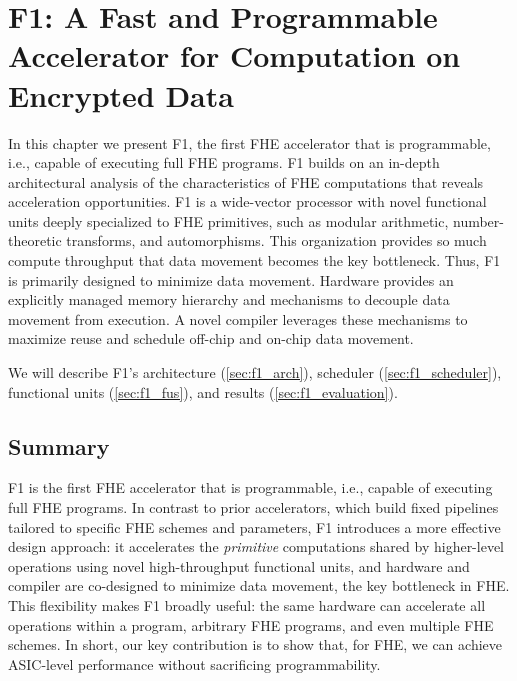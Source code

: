 \documentclass[12pt,twoside]{mitthesis}
\begin{document}


\pagestyle{plain}





\chapter{F1: A Fast and Programmable Accelerator for Computation on Encrypted Data}

In this chapter we present F1, the first FHE accelerator that is
programm\-able, i.e., capable of executing full FHE programs. F1 builds on an
in-depth architectural analysis of the characteristics of FHE computations that
reveals acceleration opportunities. F1 is a wide-vector processor with novel
functional units deeply specialized to FHE primitives, such as modular
arithmetic, number-theoretic transforms, and automorphisms. This
organization provides so much compute throughput that data movement becomes the
key bottleneck. Thus, F1 is primarily designed to minimize data movement.
Hardware provides an explicitly managed memory hierarchy and mechanisms to
decouple data movement from execution. A novel compiler leverages these
mechanisms to maximize reuse and schedule off-chip and on-chip data movement.

We will describe F1's architecture (\autoref{sec:f1_arch}), scheduler
(\autoref{sec:f1_scheduler}), functional units (\autoref{sec:f1_fus}), and
results (\autoref{sec:f1_evaluation}).





\let\cleardoublepage\clearpage %

\section{Summary}

F1 is the first FHE accelerator that is programmable, i.e., capable of
executing full FHE programs. In contrast to prior accelerators, which build
fixed pipelines tailored to specific FHE schemes and parameters, F1 introduces
a more effective design approach: it accelerates the \emph{primitive}
computations shared by higher-level operations using novel high\hyp{}throughput
functional units, and hardware and compiler are co-designed to minimize data
movement, the key bottleneck in FHE. This flexibility makes F1 broadly useful: the
same hardware can accelerate all operations within a program, arbitrary FHE
programs, and even multiple FHE schemes. In short, our key contribution is to
show that, for FHE, we can achieve ASIC-level performance without sacrificing
programmability.
\end{document}
